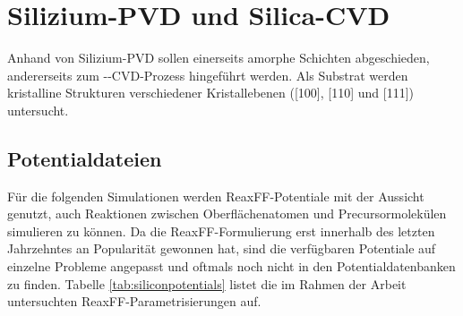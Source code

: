 \section{Silizium-PVD und Silica-CVD}
\label{siliconpvd}

Anhand von Silizium-PVD sollen einerseits amorphe Schichten abgeschieden, andererseits zum --CVD-Prozess hingeführt werden.
Als Substrat werden kristalline Strukturen verschiedener Kristallebenen ([100], [110] und [111]) untersucht.

\subsection{Potentialdateien}

Für die folgenden Simulationen werden ReaxFF-Potentiale mit der Aussicht genutzt, auch Reaktionen zwischen Oberflächenatomen und Precursormolekülen simulieren zu können.
Da die ReaxFF-Formulierung erst innerhalb des letzten Jahrzehntes an Popularität gewonnen hat, sind die verfügbaren Potentiale auf einzelne Probleme angepasst und oftmals noch nicht in den Potentialdatenbanken zu finden.
Tabelle \ref{tab:siliconpotentials} listet die im Rahmen der Arbeit untersuchten ReaxFF-Parametrisierungen auf.

